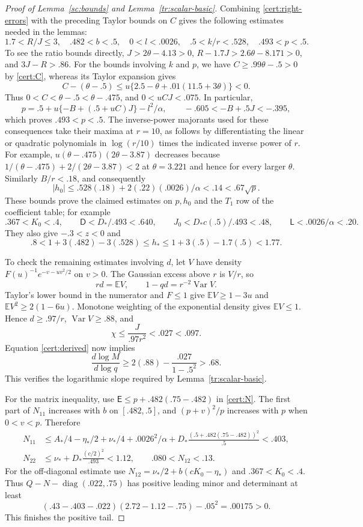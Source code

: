 \documentclass[11pt]{article}
\theoremstyle{definition}
\theoremstyle{remark}
\numberwithin{equation}{section}
\begin{document}
\begin{proof}[Proof of Lemma~\ref{sc:bounds} and Lemma~\ref{tr:scalar-basic}]
Combining \eqref{cert:right-errors} with the preceding Taylor bounds
on $C$ gives the following estimates needed in the lemmas:
\begin{equation}\label{cert:right-consequences}
 1.7<R/J\le3,\quad .482<b<.5,\quad 0<l<.0026,\quad
 .5<k/r<.528,\quad .493<p<.5.
\end{equation}
To see the ratio bounds directly, $J>2\theta-4.13>0$,
$R-1.7J>2.6\theta-8.171>0$, and $3J-R>.86$.
For the bounds involving $k$ and $p$, we have
$C\ge .99\theta-.5>0$ by \eqref{cert:C}, whereas its Taylor expansion gives
\[
 C-(\theta-.5)\le
 u\{2.5-\theta+.01(11.5+3\theta)\}<0.
\]
Thus $0<C<\theta-.5<\theta-.475$, and $0<uCJ<.075$. In particular,
\[
 p=.5+u\{-B+(.5+uC)J\}-l^2/\alpha,\qquad
 -.605<-B+.5J<-.395,
\]
which proves $.493<p<.5$. The inverse-power majorants used for these consequences take their maxima at $r=10$,
as follows by differentiating the linear or quadratic polynomials in
$\log(r/10)$ times the indicated inverse power of $r$. For example,
$u(\theta-.475)(2\theta-3.87)$ decreases because
$1/(\theta-.475)+2/(2\theta-3.87)<2$ at $\theta=3.221$ and hence
for every larger $\theta$. Similarly $B/r<.18$, and consequently
\[
 |h_0|\le .528(.18)+2(.22)(.0026)/\alpha<.14<.67\sqrt p.
\]
These bounds prove the claimed estimates on $p,h_0$ and the $T_1$ row
of the coefficient table; for example
\[
 .367<K_0<.4,\qquad \mathsf D<D_*/.493<.640,\qquad
 J_0<D_*c(.5)/.493<.48,\qquad \mathsf L<.0026/\alpha<.20.
\]
They also give $-.3<z<0$ and
\[
 .8<1+3(.482)-3(.528)\le h_*
       \le1+3(.5)-1.7(.5)<1.77.
\]

To check the remaining estimates involving $d$, let $V$ have density
$F(u)^{-1}e^{-v-uv^2/2}$ on $v>0$. The Gaussian excess above $r$
is $V/r$, so
\[
 rd=\mathbb EV,\qquad 1-qd=r^{-2}\operatorname{Var}V.
\]
Taylor's lower bound in the numerator and $F\le1$ give
$\mathbb EV\ge1-3u$ and $\mathbb EV^2\ge2(1-6u)$.
Monotone weighting of the exponential density gives
$\mathbb EV\le1$. Hence $d\ge.97/r$,
$\operatorname{Var}V\ge.88$, and
\[
 \chi\le\frac{J}{.97r^2}<.027<.097.
\]
Equation \eqref{cert:derived} now implies
\[
 \frac{d\log M}{d\log q}
 \ge2(.88)-\frac{.027}{1-.5^2}>.68.
\]
This verifies the logarithmic slope required by Lemma~\ref{tr:scalar-basic}.

For the matrix inequality, use $\mathsf E\le p+.482(.75-.482)$
in \eqref{cert:N}. The first part of $N_{11}$ increases with $b$
on $[.482,.5]$, and $(p+v)^2/p$ increases with $p$ when
$0<v<p$. Therefore
\[
 \begin{split}
 N_{11}&\le A_*/4-\eta_*/2+\nu_*/4+.0026^2/\alpha
       +D_*\frac{(.5+.482(.75-.482))^2}{.5}<.403,\\
 N_{22}&\le\nu_*+D_*\frac{(c/2)^2}{.493}<1.12,
 \qquad .080<N_{12}<.13.
 \end{split}
\]
For the off-diagonal estimate use
$N_{12}=\nu_*/2+b(cK_0-\eta_*)$ and $.367<K_0<.4$.
Thus $Q-N-\operatorname{diag}(.022,.75)$ has positive leading minor
and determinant at least
\[
 (.43-.403-.022)(2.72-1.12-.75)-.05^2=.00175>0.
\]
This finishes the positive tail.


\end{proof}
\end{document}
